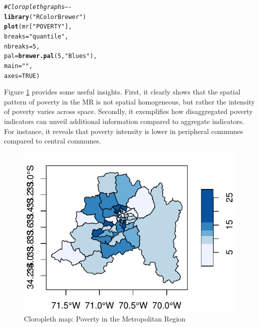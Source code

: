 \documentclass[english,12pt]{book}\usepackage[]{graphicx}\usepackage[]{xcolor}
\makeatletter
\def\maxwidth{ %
  \ifdim\Gin@nat@width>\linewidth
    \linewidth
  \else
    \Gin@nat@width
  \fi
}
\newcommand{\hlnum}[1]{\textcolor[rgb]{0.686,0.059,0.569}{#1}}%
\newcommand{\hlstr}[1]{\textcolor[rgb]{0.192,0.494,0.8}{#1}}%
\newcommand{\hlcom}[1]{\textcolor[rgb]{0.678,0.584,0.686}{\textit{#1}}}%
\newcommand{\hlstd}[1]{\textcolor[rgb]{0.345,0.345,0.345}{#1}}%
\newcommand{\hlkwc}[1]{\textcolor[rgb]{0.333,0.667,0.333}{#1}}%
\newcommand{\hlkwd}[1]{\textcolor[rgb]{0.737,0.353,0.396}{\textbf{#1}}}%
\newenvironment{kframe}{%
 \def\at@end@of@kframe{}%
 \ifinner\ifhmode%
  \def\at@end@of@kframe{\end{minipage}}%
  \begin{minipage}{\columnwidth}%
 \fi\fi%
 \def\FrameCommand##1{\hskip\@totalleftmargin \hskip-\fboxsep
 \colorbox{shadecolor}{##1}\hskip-\fboxsep
     \hskip-\linewidth \hskip-\@totalleftmargin \hskip\columnwidth}%
 \MakeFramed {\advance\hsize-\width
   \@totalleftmargin\z@ \linewidth\hsize
   \@setminipage}}%
 {\par\unskip\endMakeFramed%
 \at@end@of@kframe}
\newenvironment{knitrout}{}{} %
\makeatother
\begin{document}
\begin{knitrout}
\color{fgcolor}\begin{kframe}
\begin{alltt}
\hlcom{# Cloropleth graphs ----}
\hlkwd{library}\hlstd{(}\hlstr{"RColorBrewer"}\hlstd{)}
\hlkwd{plot}\hlstd{(mr[}\hlstr{"POVERTY"}\hlstd{],}
       \hlkwc{breaks} \hlstd{=} \hlstr{"quantile"}\hlstd{,}
       \hlkwc{nbreaks} \hlstd{=} \hlnum{5}\hlstd{,}
       \hlkwc{pal} \hlstd{=} \hlkwd{brewer.pal}\hlstd{(}\hlnum{5}\hlstd{,} \hlstr{"Blues"}\hlstd{),}
       \hlkwc{main} \hlstd{=} \hlstr{""}\hlstd{,}
       \hlkwc{axes} \hlstd{=} \hlnum{TRUE}\hlstd{)}
\end{alltt}
\end{kframe}
\end{knitrout}

Figure \ref{fig:cloro-graph} provides some useful insights. First, it clearly shows that the spatial pattern of poverty in the MR is not spatial homogeneous, but rather the intensity of poverty varies across space. Secondly, it exemplifies how disaggregated poverty indicators can unveil additional information compared to aggregate indicators. For instance, it reveals that poverty intensity is lower in peripheral communes compared to central communes.

\begin{figure}
\caption{Cloropleth map: Poverty in the Metropolitan Region}\label{fig:cloro-graph}
\begin{knitrout}
\color{fgcolor}

{\centering \includegraphics[width=\maxwidth]{figure/cloro-graphs-1} 

}


\end{knitrout}
\end{figure}
\end{document}
